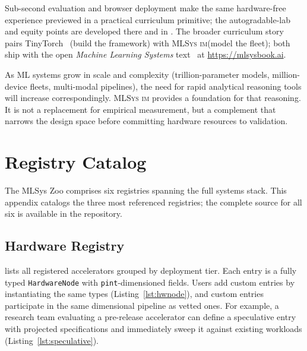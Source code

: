 \documentclass[10pt,twocolumn]{article}
\newcommand{\mlsysim}{\mbox{\textsc{MLSys}\,\textperiodcentered\,\textsc{im}}\xspace}
\begin{document}
Sub-second evaluation and browser deployment make the same hardware-free experience previewed in  a practical curriculum primitive; the autogradable-lab and equity points are developed there and in . The broader curriculum story pairs TinyTorch~\citep{tinytorch2025} (build the framework) with \mlsysim (model the fleet); both ship with the open \emph{Machine Learning Systems} text~\citep{mlsysbook2025} at \url{https://mlsysbook.ai}.

As ML systems grow in scale and complexity (trillion-parameter models, million-device fleets, multi-modal pipelines), the need for rapid analytical reasoning tools will increase correspondingly. \mlsysim provides a foundation for that reasoning. It is not a replacement for empirical measurement, but a complement that narrows the design space before committing hardware resources to validation.



\clearpage
\onecolumn
\appendix

\section{Registry Catalog}
\label{sec:appendix-hardware}

The MLSys Zoo comprises six registries spanning the full systems stack. This appendix catalogs the three most referenced registries; the complete source for all six is available in the repository.

\subsection{Hardware Registry}

 lists all registered accelerators grouped by deployment tier. Each entry is a fully typed \texttt{HardwareNode} with \texttt{pint}-dimensioned fields. Users add custom entries by instantiating the same types (Listing~\ref{lst:hwnode}), and custom entries participate in the same dimensional pipeline as vetted ones. For example, a research team evaluating a pre-release accelerator can define a speculative entry with projected specifications and immediately sweep it against existing workloads (Listing~\ref{lst:speculative}).
\end{document}

